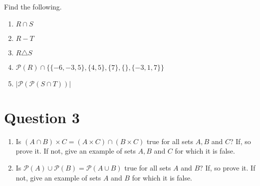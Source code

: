 \documentclass[11pt]{article}
\begin{document}
Find the following.

\begin{enumerate}[label=(\roman*)]
	\item $R \cap S$
	\item $R - T$
	\item $R \triangle S$
	\item $\mathcal{P} (R) \cap \{ \{-6,-3,5\},\{4,5\},\{7\},\{\},\{-3,1,7\}\}$ 
	\item $|\mathcal{P}(\mathcal{P}(S \cap T))|$
\end{enumerate}

\section*{Question 3}

\begin{enumerate}[label=(\roman*)]
	\item Is $(A\cap B) \times C = (A \times C) \cap (B \times C)$ true for all sets $A,B$ and $C$? If, so prove it. If not, give an example of sets $A,B$ and $C$ for which it is false.
	
	\item Is $\mathcal{P}(A)\cup \mathcal{P}(B) = \mathcal{P}(A \cup B)$ true for all sets $A$ and $B$? If, so prove it. If not, give an example of sets $A$ and $B$ for which it is false.
\end{enumerate}
\end{document}
